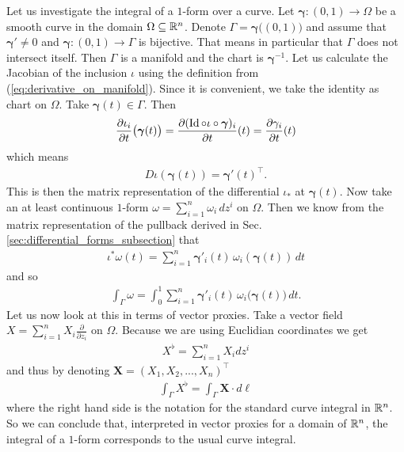 \documentclass[../master_thesis.tex]{subfiles}
\begin{document}
\begin{example}\label{ex:integration_1_forms}
    Let us investigate the integral of a $1$-form over a curve. 
    Let $\bm{\gamma}: (0,1) \rightarrow \Omega$ be a smooth curve in the domain $\Omega 
    \subseteq \mathbb{R}^n$. Denote $\Gamma = \bm{\gamma}\big((0,1)\big)$ and assume that 
    $\bm{\gamma}' \neq 0$ and $\bm{\gamma}: (0,1) \rightarrow \Gamma$ is bijective.
    That means in particular that $\Gamma$ does not intersect itself.
    Then $\Gamma$ is a manifold and the chart is $\bm{\gamma}^{-1}$.
    Let us calculate the Jacobian of the inclusion $\iota$ using the 
    definition from (\ref{eq:derivative_on_manifold}). 
    Since it is convenient, we take the 
    identity as chart on $\Omega$. Take $\bm{\gamma}(t) \in \Gamma$. Then
    \begin{align*}
        \frac{\partial\iota_i}{\partial t} \big(\bm{\gamma}(t)\big) 
        = \frac{\partial (\operatorname{Id} \circ \iota \circ \bm{\gamma})_i}{\partial t}(t) 
        = \frac{\partial \gamma_i}{\partial t}(t)
    \end{align*} 
    which means
    \begin{align*}
        D\iota(\bm{\gamma}(t)) = \bm{\gamma}'(t)^\top.
    \end{align*}
    This is then the matrix representation of the differential $\iota_*$ at 
    $\bm{\gamma}(t)$.
    Now take an at least continuous $1$-form $\omega = \sum_{i=1}^n \omega_i \,dz^i$ 
    on $\Omega$. Then we know from the matrix representation of the 
    pullback derived in Sec.\,\ref{sec:differential_forms_subsection} that 
    \begin{align*}
        \iota^*\omega (t) = \sum_{i=1}^n \bm{\gamma}'_i(t) \, \omega_i(\bm{\gamma}(t)) \,dt
    \end{align*}
    and so
    \begin{align*}
        \int_\Gamma \omega = \int_0^1\sum_{i=1}^n \bm{\gamma}'_i(t) \, \omega_i\big(\bm{\gamma}(t)\big) \,dt.
    \end{align*}
    Let us now look at this in terms of vector proxies. Take a vector field 
    $X = \sum_{i=1}^n X_i \frac{\partial}{\partial z_i}$ on $\Omega$.
    Because we are using Euclidian coordinates we get
    \begin{align*}
        X^\flat = \sum_{i=1}^n X_i dz^i
    \end{align*}
    and thus by denoting $\mathbf{X} = (X_1, X_2, ..., X_n)^\top$
    \begin{align*}
        \int_\Gamma X^\flat = \int_\Gamma \mathbf{X}\cdot d\ell
    \end{align*}
    where the right hand side is the notation for the standard curve integral 
    in $\mathbb{R}^n$. So we can conclude that, interpreted in vector proxies for 
    a domain of $\mathbb{R}^n$, the integral of a $1$-form corresponds to the usual 
    curve integral.
\end{example}
\end{document}
